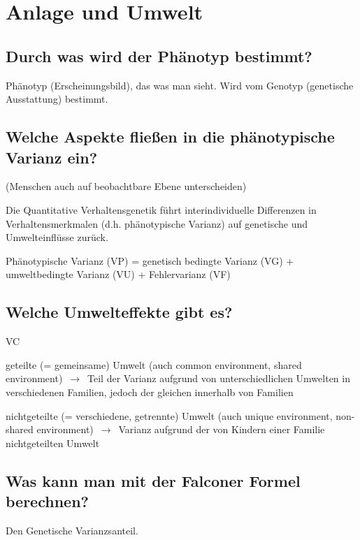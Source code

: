 \documentclass[a6paper,10pt,DIV=40]{scrartcl}
\begin{document}
\section{Anlage und Umwelt}
\subsection{Durch was wird der Phänotyp bestimmt?}
Phänotyp (Erscheinungsbild), das was man sieht. Wird vom Genotyp (genetische Ausstattung) bestimmt.
\subsection{Welche Aspekte fließen in die phänotypische Varianz ein?}
(Menschen auch auf beobachtbare Ebene unterscheiden)

Die Quantitative Verhaltensgenetik führt interindividuelle Differenzen in Verhaltensmerkmalen (d.h. phänotypische Varianz) auf genetische und Umwelteinflüsse zurück.

Phänotypische Varianz (VP) = genetisch bedingte Varianz (VG) + umweltbedingte Varianz (VU) + Fehlervarianz (VF)

\subsection{Welche Umwelteffekte gibt es?}
\begin{labeling}{VC}
\item [VC] geteilte (= gemeinsame) Umwelt (auch common environment, shared
environment) $\,\to\,$ Teil der Varianz aufgrund von unterschiedlichen Umwelten in
verschiedenen Familien, jedoch der gleichen innerhalb von Familien

\item [VE] nichtgeteilte (= verschiedene, getrennte) Umwelt (auch unique
environment, non-shared environment) $\,\to\,$ Varianz aufgrund der von Kindern
einer Familie nichtgeteilten Umwelt
\end{labeling}
\subsection{Was kann man mit der Falconer Formel berechnen?}
Den Genetische Varianzsanteil.
\end{document}
